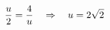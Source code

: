 \documentclass[preview]{standalone}
\begin{document}
\begin{align*}
\special{dvisvgm:raw <g id='unique000'>}\frac{u}{2}=\frac{4}{u}\quad\Rightarrow\quad u=2\sqrt2\special{dvisvgm:raw </g>}
\end{align*}
\end{document}

